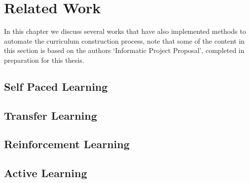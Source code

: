 \chapter{Related Work}\label{Related Work}
In this chapter we discuss several works that have also implemented methods to automate the curriculum construction process, note that some of the content in this section is based on the authors `Informatic Project Proposal', completed in preparation for this thesis.

\section{Self Paced Learning}

\section{Transfer Learning}

\section{Reinforcement Learning}

\section{Active Learning}